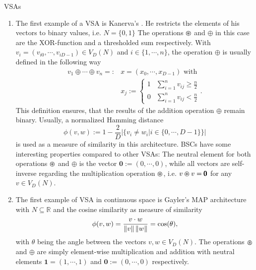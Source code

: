 \begin{ex} \aclp{VSA}
	\label{ex:VSAs}
	\begin{enumerate}
		\item The first example of a \ac{VSA} is Kanerva's  \cite{Kanerva2009}.
		He restricts the elements of his vectors to binary values, i.e. $N=\{0,1\}$
		The operations $\varoast$ and $\oplus$ in this case are the XOR-function and a thresholded sum respectively.
		With $v_{i} = \left(v_{i 0}, \cdots, v_{i D-1}\right) \in V_{D}(N)$ and  $i \in \{1, \cdots, n\}$, the operation $\oplus$ is usually defined in the following way
		\begin{align*}
			v_{1} \oplus \cdots \oplus v_{n} =: &x = \left(x_{0}, \cdots, x_{D-1}\right) \textrm{ with } \\
			&x_{j}:= \begin{cases}
				1 & \sum\limits_{i=1}^{n} v_{ij} \geq \frac{n}{2} \\
				0 & \sum\limits_{i=1}^{n} v_{ij} < \frac{n}{2}
			\end{cases}.
		\end{align*}
		This definition ensures, that the results of the addition operation $\oplus$ remain binary.
		Usually, a normalized Hamming distance
		\[
		\phi(v,w) := 1 - \frac{2}{D} \left| \{ v_{i} \neq w_{i} | i \in \{0, \cdots, D-1\} \} \right|
		\]
		is used as a measure of similarity in this architecture.
		\acp{BSC} have some interesting properties compared to other \acp{VSA}:
		The neutral element for both operations $\varoast$ and $\oplus$ is the vector $\pmb{0} := \left(0, \cdots, 0\right)$, while all vectors are self-inverse regarding the multiplication operation $\varoast$, i.e. $v \varoast v = \pmb{0}$ for any $v \in V_{D}(N)$.

		\item The first example of \ac{VSA} in continuous space is Gayler's \acrfull{MAP} architecture \cite{Gayler1998} with $N \subseteq \mathbb{R}$ and the cosine similarity as measure of similarity
		\[
		\phi(v,w) = \frac{v \cdot w}{\left\| v \right\|\left\| w \right\|}=\cos(\theta),
		\]
		with $\theta$ being the angle between the vectors $v,w \in V_{D}(N)$.
		The operations $\varoast$ and $\oplus$ are simply element-wise multiplication and addition with neutral elements $\pmb{1}=\left(1, \cdots, 1\right)$ and $\pmb{0} := \left(0, \cdots, 0\right)$ respectively.


\end{enumerate}
\end{ex}

